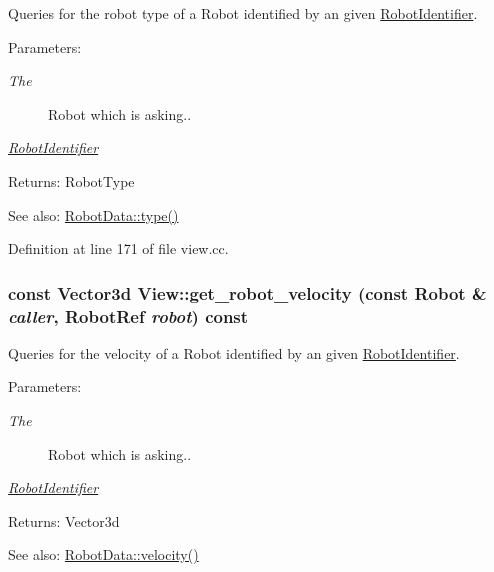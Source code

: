 Queries for the robot type of a Robot identified by an given \hyperlink{class_robot_identifier}{RobotIdentifier}. \begin{Desc}
\item[Parameters:]
\begin{description}
\item[{\em The}]Robot which is asking.. \item[{\em \hyperlink{class_robot_identifier}{RobotIdentifier}}]\end{description}
\end{Desc}
\begin{Desc}
\item[Returns:]RobotType \end{Desc}
\begin{Desc}
\item[See also:]\hyperlink{class_robot_data_b83255012ce788fdbf9b277c775e0240}{RobotData::type()} \end{Desc}


Definition at line 171 of file view.cc.\hypertarget{class_view_8fb901f861b3caa776cdd40a8937b929}{
\subsubsection[get\_\-robot\_\-velocity]{\setlength{\rightskip}{0pt plus 5cm}const Vector3d View::get\_\-robot\_\-velocity (const Robot \& {\em caller}, \/  RobotRef {\em robot}) const}}
\label{class_view_8fb901f861b3caa776cdd40a8937b929}


Queries for the velocity of a Robot identified by an given \hyperlink{class_robot_identifier}{RobotIdentifier}. \begin{Desc}
\item[Parameters:]
\begin{description}
\item[{\em The}]Robot which is asking.. \item[{\em \hyperlink{class_robot_identifier}{RobotIdentifier}}]\end{description}
\end{Desc}
\begin{Desc}
\item[Returns:]Vector3d \end{Desc}
\begin{Desc}
\item[See also:]\hyperlink{class_robot_data_933da54224245d40afb0ed1b2446599c}{RobotData::velocity()} \end{Desc}


